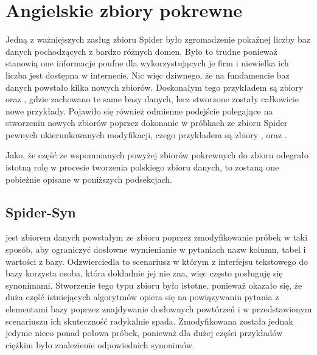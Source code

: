 \section{Angielskie zbiory pokrewne} \label{text:related-datasets}
Jedną z ważniejszych zasług zbioru Spider było zgromadzenie pokaźnej liczby baz danych pochodzących z bardzo różnych domen. Było to trudne ponieważ stanowią one informacje poufne dla wykorzystujących je firm i niewielka ich liczba jest dostępna w internecie. Nic więc dziwnego, że na fundamencie baz danych  powstało kilka nowych zbiorów. Doskonałym tego przykładem są zbiory  oraz , gdzie zachowano te same bazy danych, lecz stworzone zostały całkowicie nowe przykłady. Pojawiło się również odmienne podejście polegające na stworzeniu nowych zbiorów poprzez dokonanie w próbkach ze zbioru Spider pewnych ukierunkowanych modyfikacji, czego przykładem są zbiory ,  oraz .

Jako, że część ze wspomnianych powyżej zbiorów pokrewnych do zbioru  odegrało istotną rolę w procesie tworzenia polskiego zbioru danych, to zostaną one pobieżnie opisane w poniższych podsekcjach.

\subsection{Spider-Syn}
 jest zbiorem danych powstałym ze zbioru  poprzez zmodyfikowanie próbek w taki sposób, aby ograniczyć dosłowne wymienianie w pytaniach nazw kolumn, tabel i wartości z bazy. Odzwierciedla to scenariusz w którym z interfejsu tekstowego do bazy korzysta osoba, która dokładnie jej nie zna, więc często posługuję się synonimami. Stworzenie tego typu zbioru było istotne, ponieważ okazało się, że duża część istniejących algorytmów opiera się na powiązywaniu pytania z elementami bazy poprzez znajdywanie dosłownych powtórzeń i w przedstawionym scenariuszu ich skuteczność radykalnie spada. Zmodyfikowana została jednak jedynie nieco ponad połowa próbek, ponieważ dla dużej części przykładów ciężkim było znalezienie odpowiednich synonimów.

\begin{minipage}{\linewidth}

\end{minipage}

